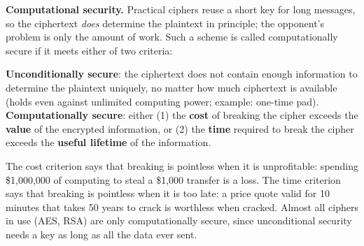 \textbf{Computational security.} Practical ciphers reuse a short key for long messages, so the ciphertext \emph{does} determine the plaintext in principle; the opponent's problem is only the amount of work. Such a scheme is called computationally secure if it meets either of two criteria:
\begin{mustknow}
\textbf{Unconditionally secure}: the ciphertext does not contain enough information to determine the plaintext uniquely, no matter how much ciphertext is available (holds even against unlimited computing power; example: one-time pad).\\[2pt]
\textbf{Computationally secure}: either (1) the \textbf{cost} of breaking the cipher exceeds the \textbf{value} of the encrypted information, or (2) the \textbf{time} required to break the cipher exceeds the \textbf{useful lifetime} of the information.
\end{mustknow}
The cost criterion says that breaking is pointless when it is unprofitable: spending \$1{,}000{,}000 of computing to steal a \$1{,}000 transfer is a loss. The time criterion says that breaking is pointless when it is too late: a price quote valid for 10 minutes that takes 50 years to crack is worthless when cracked. Almost all ciphers in use (AES, RSA) are only computationally secure, since unconditional security needs a key as long as all the data ever sent.

